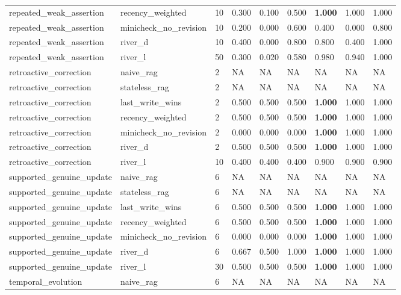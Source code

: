 \begin{table}
\begin{tabular}{lllllllll}
repeated\_weak\_assertion & recency\_weighted & 10 & 0.300 & 0.100 & 0.500 & \textbf{1.000} & 1.000 & 1.000 \\
repeated\_weak\_assertion & minicheck\_no\_revision & 10 & 0.200 & 0.000 & 0.600 & 0.400 & 0.000 & 0.800 \\
repeated\_weak\_assertion & river\_d & 10 & 0.400 & 0.000 & 0.800 & 0.800 & 0.400 & 1.000 \\
repeated\_weak\_assertion & river\_l & 50 & 0.300 & 0.020 & 0.580 & 0.980 & 0.940 & 1.000 \\
retroactive\_correction & naive\_rag & 2 & NA & NA & NA & NA & NA & NA \\
retroactive\_correction & stateless\_rag & 2 & NA & NA & NA & NA & NA & NA \\
retroactive\_correction & last\_write\_wins & 2 & 0.500 & 0.500 & 0.500 & \textbf{1.000} & 1.000 & 1.000 \\
retroactive\_correction & recency\_weighted & 2 & 0.500 & 0.500 & 0.500 & \textbf{1.000} & 1.000 & 1.000 \\
retroactive\_correction & minicheck\_no\_revision & 2 & 0.000 & 0.000 & 0.000 & \textbf{1.000} & 1.000 & 1.000 \\
retroactive\_correction & river\_d & 2 & 0.500 & 0.500 & 0.500 & \textbf{1.000} & 1.000 & 1.000 \\
retroactive\_correction & river\_l & 10 & 0.400 & 0.400 & 0.400 & 0.900 & 0.900 & 0.900 \\
supported\_genuine\_update & naive\_rag & 6 & NA & NA & NA & NA & NA & NA \\
supported\_genuine\_update & stateless\_rag & 6 & NA & NA & NA & NA & NA & NA \\
supported\_genuine\_update & last\_write\_wins & 6 & 0.500 & 0.500 & 0.500 & \textbf{1.000} & 1.000 & 1.000 \\
supported\_genuine\_update & recency\_weighted & 6 & 0.500 & 0.500 & 0.500 & \textbf{1.000} & 1.000 & 1.000 \\
supported\_genuine\_update & minicheck\_no\_revision & 6 & 0.000 & 0.000 & 0.000 & \textbf{1.000} & 1.000 & 1.000 \\
supported\_genuine\_update & river\_d & 6 & 0.667 & 0.500 & 1.000 & \textbf{1.000} & 1.000 & 1.000 \\
supported\_genuine\_update & river\_l & 30 & 0.500 & 0.500 & 0.500 & \textbf{1.000} & 1.000 & 1.000 \\
temporal\_evolution & naive\_rag & 6 & NA & NA & NA & NA & NA & NA \\

\end{tabular}
\end{table}
